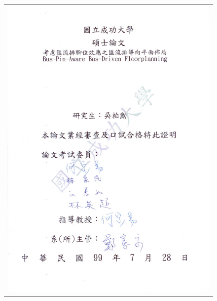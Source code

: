 \documentclass[12pt, a4paper]{report}
\begin{document}
\begin{figure}[h]
\centering
\vspace{-29mm}
\begin{tabular}{c}
\hspace{-36mm} \includegraphics[]{./ncku/oral-chi.pdf}
\end{tabular}
\end{figure}
\newpage
\newpage
\end{document}
